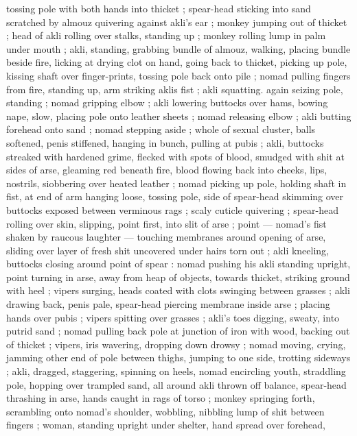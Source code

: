tossing pole with both hands into thicket ; spear-head sticking into 
sand scratched by almouz quivering against akli's ear ; monkey 
jumping out of thicket ; head of akli rolling over stalks, standing up 
; monkey rolling lump in palm under mouth ; akli, standing, grabbing 
bundle of almouz, walking, placing bundle beside fire, licking at 
drying clot on hand, going back to thicket, picking up pole, kissing 
shaft over finger-prints, tossing pole back onto pile ; nomad pulling 
fingers from fire, standing up, arm striking aklis fist ; akli squatting. 
again seizing pole, standing ; nomad gripping elbow ; akli lowering 
buttocks over hams, bowing nape, slow, placing pole onto leather 
sheets ; nomad releasing elbow ; akli butting forehead onto sand ; 
nomad stepping aside ; whole of sexual cluster, balls softened, penis 
stiffened, hanging in bunch, pulling at pubis ; akli, buttocks streaked 
with hardened grime, flecked with spots of blood, smudged with shit 
at sides of arse, gleaming red beneath fire, blood flowing back into 
cheeks, lips, nostrils, siobbering over heated leather ; nomad picking 
up pole, holding shaft in fist, at end of arm hanging loose, tossing 
pole, side of spear-head skimming over buttocks exposed between 
verminous rags ; scaly cuticle quivering ; spear-head rolling over 
skin, slipping, point first, into slit of arse ; point --- nomad's fist 
shaken by raucous laughter --- touching membranes around opening 
of arse, sliding over layer of fresh shit uncovered under hairs torn 
out ; akli kneeling, buttocks closing around point of spear : nomad 
pushing his akli standing upright, point turning in arse, away from 
heap of objects, towards thicket, striking ground with heel ; vipers 
surging, heads coated with clots swinging between grasses ; akli 
drawing back, penis pale, spear-head piercing membrane inside arse 
; placing hands over pubis ; vipers spitting over grasses ; akli's toes 
digging, sweaty, into putrid sand ; nomad pulling back pole at 
junction of iron with wood, backing out of thicket ; vipers, iris 
wavering, dropping down drowsy ; nomad moving, crying, jamming 
other end of pole between thighs, jumping to one side, trotting 
sideways ; akli, dragged, staggering, spinning on heels, nomad 
encircling youth, straddling pole, hopping over trampled sand, all 
around akli thrown off balance, spear-head thrashing in arse, hands 
caught in rags of torso ; monkey springing forth, scrambling onto 
nomad's shoulder, wobbling, nibbling lump of shit between fingers ; 
woman, standing upright under shelter, hand spread over forehead, 
